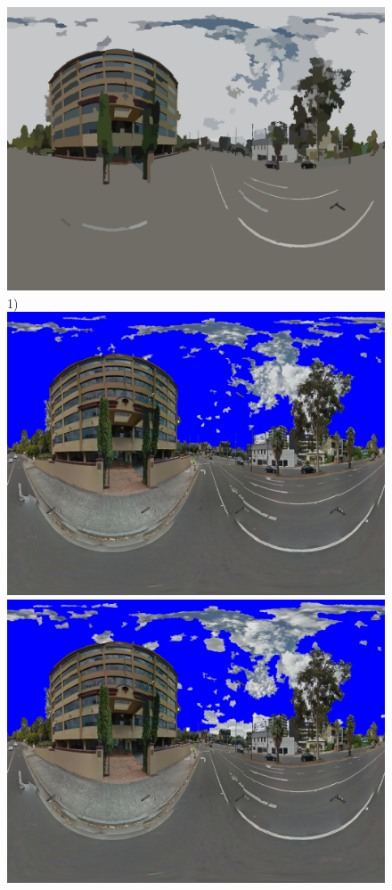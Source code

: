 \documentclass[final,3p,times,authoryear]{elsarticle}
\begin{document}
\begin{figure}
\textbf{}\includegraphics[scale=0.08]{Images/mean/4880_7_8_300.png} 1)
\textbf{}\includegraphics[scale=0.08]{Images/mean/4880_3_6_100_ms_sky_mark.png} 
\textbf{}\includegraphics[scale=0.08]{Images/mean/4880_7_6_100_ms_sky_mark.png} 

\end{figure}
\end{document}
